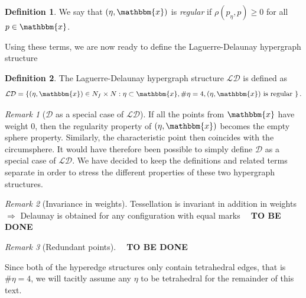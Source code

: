 \documentclass[12pt,a4paper]{article}
\theoremstyle{definition}
\newtheorem{definition}{Definition}
\theoremstyle{remark}
\newtheorem{remark}{Remark}
\theoremstyle{theorem}
\newcommand{\tbd}{\textbf{{\color{red}~ TO BE DONE ~}}}
\newcommand{\x}{\mathbbm{x}}
\begin{document}

\begin{definition}
We say that $(\eta,\x)$ is \textit{regular} if $\rho(p_\eta,p)\geq 0 $ for all $p \in \x$.
\end{definition}


Using these terms, we are now ready to define the Laguerre-Delaunay hypergraph structure

\begin{definition}
	The Laguerre-Delaunay hypergraph structure $\mathcal {LD}$ is defined as 
	$$\mathcal {LD} = \left\{ (\eta,\x) \in N_f \times N: \eta \subset \x, \# \eta = 4, (\eta,\x) \text{ is regular } \right\}.$$
\end{definition}


\begin{remark}[$\mathcal D$ as a special case of $\mathcal {LD}$] If all the points from $\x$ have weight 0, then the regularity property of $(\eta, \x)$ becomes the empty sphere property. Similarly, the characteristic point then coincides with the circumsphere. It would have therefore been possible to simply define $\mathcal D$ as a special case of $\mathcal {LD}$. We have decided to keep the definitions and related terms separate in order to stress the different properties of these two hypergraph structures. 
\end{remark}


\begin{remark}[Invariance in weights] \label{r:invariance} Tessellation is invariant in addition in weights $\Rightarrow$ Delaunay is obtained for any configuration with equal marks \tbd
\end{remark}

\begin{remark}[Redundant points]
	\tbd
\end{remark}

Since both of the hyperedge structures only contain tetrahedral edges, that is $\# \eta = 4$, we will tacitly assume any $\eta$ to be tetrahedral for the remainder of this text. 
\end{document}
